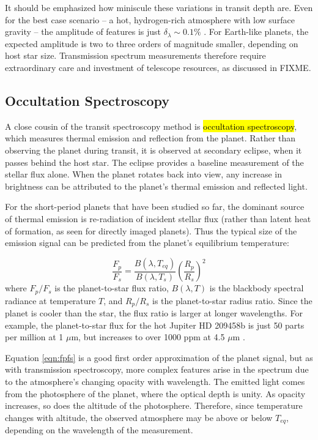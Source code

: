 \documentclass[graybox,natbib,nosecnum]{svmult}
\newcommand{\hbindex}[1]{\hl{#1}\index{#1}}  %
\begin{document}
It should be emphasized how miniscule these variations in transit depth are. Even for the best case scenario -- a hot, hydrogen-rich atmosphere with low surface gravity -- the amplitude of features is just $\delta_\lambda \sim0.1\%$ \citep[e.g. WASP 121-b;][]{evans16}. For Earth-like planets, the expected amplitude is two to three orders of magnitude smaller, depending on host star size. Transmission spectrum measurements therefore require extraordinary care and investment of telescope resources, as discussed in FIXME.

\subsection{Occultation Spectroscopy}
A close cousin of the transit spectroscopy method is \hbindex{occultation spectroscopy}, which measures thermal emission and reflection from the planet. Rather than observing the planet during transit, it is observed at secondary eclipse, when it passes behind the host star. The eclipse provides a baseline measurement of the stellar flux alone. When the planet rotates back into view, any increase in brightness can be attributed to the planet's thermal emission and reflected light.

For the short-period planets that have been studied so far, the dominant source of thermal emission is re-radiation of incident stellar flux (rather than latent heat of formation, as seen for directly imaged planets). Thus the typical size of the emission signal can be predicted from the planet's equilibrium temperature:

\begin{equation}
\label{eqn:fpfs}
\frac{F_p}{F_s} = \frac{B(\lambda, T_{eq})}{B(\lambda, T_s)}\left(\frac{R_p}{R_s}\right)^2
\end{equation}
where $F_p/F_s$ is the planet-to-star flux ratio, $B(\lambda, T)$ is the blackbody spectral radiance at temperature $T$, and $R_p/R_s$ is the planet-to-star radius ratio. Since the planet is cooler than the star, the flux ratio is larger at longer wavelengths. For example, the planet-to-star flux for the hot Jupiter HD 209458b is just 50 parts per million at 1 $\mu$m, but increases to over 1000 ppm at 4.5 $\mu$m \citep{line16}.

Equation \ref{eqn:fpfs} is a good first order approximation of the planet signal, but as with transmission spectroscopy, more complex features arise in the spectrum due to the atmosphere's changing opacity with wavelength. The emitted light comes from the photosphere of the planet, where the optical depth is unity.  As opacity increases, so does the altitude of the photosphere.  Therefore, since temperature changes with altitude, the observed atmosphere may be above or below $T_{eq}$, depending on the wavelength of the measurement. 
\end{document}
